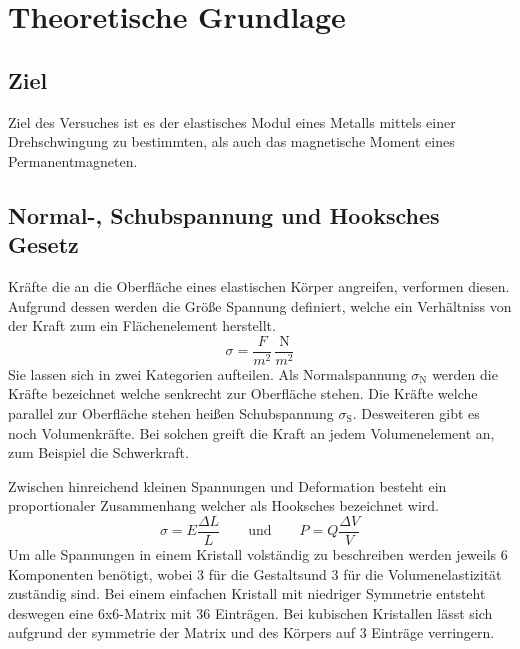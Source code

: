 \section{Theoretische Grundlage}
\label{sec:Theorie}
\subsection{Ziel}
Ziel des Versuches ist es der elastisches Modul eines Metalls mittels einer Drehschwingung zu bestimmten, als auch das magnetische Moment eines Permanentmagneten.
\subsection{Normal-, Schubspannung und Hooksches Gesetz}
Kräfte die an die Oberfläche eines elastischen Körper angreifen, verformen diesen. Aufgrund dessen werden die Größe Spannung definiert, welche ein Verhältniss von der Kraft zum ein Flächenelement herstellt.
\begin{equation}
  \sigma = \frac{F}{m^2} \, \frac{\text{N}}{m^2}
  \label{eqn:Spannung}
\end{equation}
Sie lassen sich in zwei Kategorien aufteilen. Als Normalspannung $\sigma_\text{N}$ werden die Kräfte bezeichnet welche senkrecht zur Oberfläche stehen. Die Kräfte welche parallel zur Oberfläche stehen heißen Schubspannung $\sigma_\text{S}$. Desweiteren gibt es noch Volumenkräfte. Bei solchen greift die Kraft an jedem Volumenelement an, zum Beispiel die Schwerkraft.

Zwischen hinreichend kleinen Spannungen und Deformation besteht ein proportionaler Zusammenhang welcher als Hooksches bezeichnet wird.
\begin{equation}
  \sigma = E \frac{\Delta L}{L}  \hspace{2em} \text{und} \hspace{2em} P = Q\frac{\Delta V}{V}
  \label{eqn:Hook}
\end{equation}
Um alle Spannungen in einem Kristall volständig zu beschreiben werden jeweils 6 Komponenten benötigt, wobei 3 für die Gestaltsund 3 für die Volumenelastizität zuständig sind. Bei einem einfachen  Kristall mit niedriger Symmetrie entsteht deswegen eine 6x6-Matrix mit 36 Einträgen. Bei kubischen Kristallen lässt sich aufgrund der symmetrie der Matrix und des Körpers auf 3 Einträge verringern.

